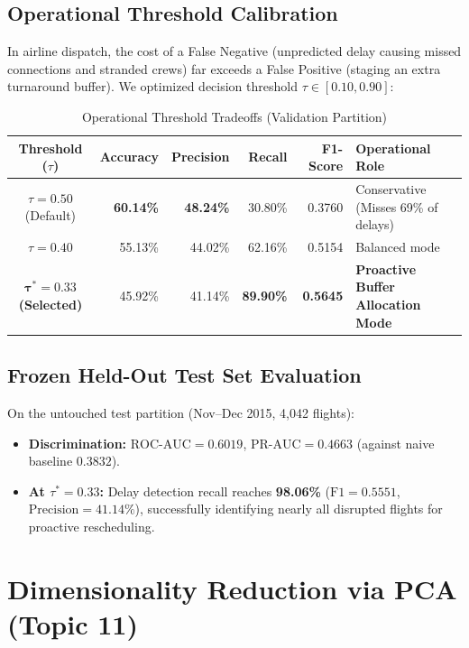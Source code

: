 \documentclass[11pt,a4paper]{article}
\begin{document}
\subsection{Operational Threshold Calibration}
In airline dispatch, the cost of a False Negative (unpredicted delay causing missed connections and stranded crews) far exceeds a False Positive (staging an extra turnaround buffer). We optimized decision threshold $\tau \in [0.10, 0.90]$:
\begin{table}[H]
\centering
\small
\caption{Operational Threshold Tradeoffs (Validation Partition)}
\label{tab:thresholds}
\begin{tabular}{crrrrl}
\toprule
\textbf{Threshold ($\tau$)} & \textbf{Accuracy} & \textbf{Precision} & \textbf{Recall} & \textbf{F1-Score} & \textbf{Operational Role} \\
\midrule
$\tau = 0.50$ (Default) & \textbf{60.14\%} & \textbf{48.24\%} & 30.80\% & 0.3760 & Conservative (Misses 69\% of delays) \\
$\tau = 0.40$ & 55.13\% & 44.02\% & 62.16\% & 0.5154 & Balanced mode \\
$\mathbf{\tau^* = 0.33}$ \textbf{(Selected)} & 45.92\% & 41.14\% & \textbf{89.90\%} & \textbf{0.5645} & \textbf{Proactive Buffer Allocation Mode} \\
\bottomrule
\end{tabular}
\end{table}

\subsection{Frozen Held-Out Test Set Evaluation}
On the untouched test partition (Nov--Dec 2015, 4,042 flights):
\begin{itemize}[noitemsep]
    \item \textbf{Discrimination:} $\text{ROC-AUC} = \mathbf{0.6019}$, $\text{PR-AUC} = \mathbf{0.4663}$ (against naive baseline $0.3832$).
    \item \textbf{At $\tau^* = 0.33$:} Delay detection recall reaches \textbf{98.06\%} ($\text{F1} = 0.5551$, $\text{Precision} = 41.14\%$), successfully identifying nearly all disrupted flights for proactive rescheduling.
\end{itemize}

\section{Dimensionality Reduction via PCA (Topic 11)}
\end{document}
